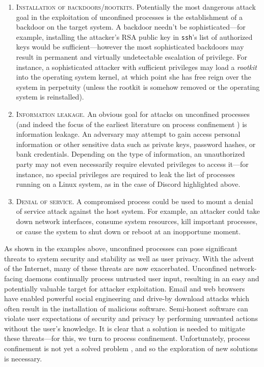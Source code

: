 \documentclass[dvipsnames, 12pt]{article}
\begin{document}
\begin{enumerate}[label=\bfseries G\arabic*., ref=G\arabic*, labelindent=2em]
    \item \label{g:1} \textsc{Installation of backdoors/rootkits.} Potentially
    the most dangerous attack goal in the exploitation of unconfined processes
    is the establishment of a backdoor on the target system.  A backdoor needn't
    be sophisticated---for example, installing the attacker's RSA public key in
    \texttt{ssh}'s list of authorized keys would be sufficient---however the
    most sophisticated backdoors may result in permanent and virtually
    undetectable escalation of privilege. For instance, a sophisticated attacker
    with sufficient privileges may load a \textit{rootkit}
    \cite{beegle2007_rootkit} into the operating system kernel, at which point
    she has free reign over the system in perpetuity (unless the rootkit is
    somehow removed or the operating system is reinstalled).

    \item \label{g:2} \textsc{Information leakage.} An obvious goal for attacks
    on unconfined processes (and indeed the focus of the earliest literature on
    process confinement \cite{lampson1973_a_note}) is information leakage. An
    adversary may attempt to gain access personal information or other sensitive
    data such as private keys, password hashes, or bank credentials. Depending
    on the type of information, an unauthorized party may not even necessarily
    require elevated privileges to access it---for instance, no special
    privileges are required to leak the list of processes running on a Linux
    system, as in the case of Discord \cite{discord} highlighted above.

    \item \label{g:3} \textsc{Denial of service.} A compromised process could be
    used to mount a denial of service attack against the host system. For
    example, an attacker could take down network interfaces, consume system
    resources, kill important processes, or cause the system to shut down or
    reboot at an inopportune moment.
\end{enumerate}

As shown in the examples above, unconfined processes can pose significant
threats to system security and stability as well as user privacy. With the
advent of the Internet, many of these threats are now exacerbated. Unconfined
network-facing daemons continually process untrusted user input, resulting in an
easy and potentially valuable target for attacker exploitation. Email and web
browsers have enabled powerful social engineering and drive-by download attacks
which often result in the installation of malicious software. Semi-honest
software can violate user expectations of security and privacy by performing
unwanted actions without the user's knowledge. It is clear that a solution is
needed to mitigate these threats---for this, we turn to process confinement.
Unfortunately, process confinement is not yet a solved problem
\cite{crowell2013_confinement_problem}, and so the exploration of new solutions
is necessary.
\end{document}
